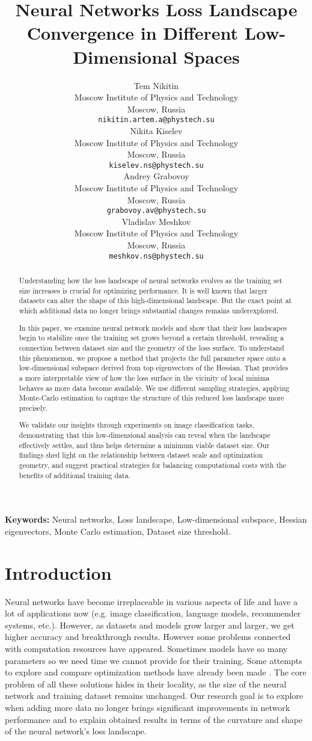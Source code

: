 \documentclass{article}
\title{Neural Networks Loss Landscape Convergence in Different Low-Dimensional Spaces}
\author{
  Tem Nikitin\\
  Moscow Institute of Physics and Technology\\
  Moscow, Russia\\
  \texttt{nikitin.artem.a@phystech.su}\\
  \And
  Nikita Kiselev\\
  Moscow Institute of Physics and Technology\\
  Moscow, Russia\\
  \texttt{kiselev.ns@phystech.su}\\
  \And
  Andrey Grabovoy\\
  Moscow Institute of Physics and Technology\\
  Moscow, Russia\\
  \texttt{grabovoy.av@phystech.su}\\
  \And
  Vladislav Meshkov\\
  Moscow Institute of Physics and Technology\\
  Moscow, Russia\\
  \texttt{meshkov.ns@phystech.su}\\
}
\begin{document}
\maketitle

\begin{abstract}
  Understanding how the loss landscape of neural networks evolves as the training set size increases is crucial for
  optimizing performance. It is well known that larger datasets can alter the shape of this high-dimensional landscape.
  But the exact point at which additional data no longer brings substantial changes remains underexplored.

  In this paper, we examine neural network models and show that their loss landscapes begin to stabilize once the
  training set grows beyond a certain threshold, revealing a connection between dataset size and the geometry of the
  loss surface. To understand this phenomenon, we propose a method that projects the full parameter space onto a
  low-dimensional subspace derived from top eigenvectors of the Hessian. That provides a more interpretable view of how
  the loss surface in the vicinity of local minima behaves as more data become available. We use different sampling
  strategies, applying Monte-Carlo estimation to capture the structure of this reduced loss landscape more precisely.

  We validate our insights through experiments on image classification tasks, demonstrating that this low-dimensional
  analysis can reveal when the landscape effectively settles, and thus helps determine a minimum viable dataset size.
  Our findings shed light on the relationship between dataset scale and optimization geometry, and suggest
  practical strategies for balancing computational costs with the benefits of additional training data.
\end{abstract}

\textbf{Keywords:}
Neural networks, Loss landscape, Low-dimensional subspace, Hessian eigenvectors, Monte Carlo estimation, Dataset size threshold.

\section{Introduction}\label{sec:intro}

Neural networks have become irreplaceable in various aspects of life and have a lot of applications now
(e.g. image classification, language models, recommender systems, etc.). However, as datasets and models grow larger and
larger, we get higher accuracy and breakthrough results. However some problems connected with computation resources have
appeared. Sometimes models have so many parameters so we need time we cannot provide for their training. Some attempts to
explore and compare optimization methods have already been made \cite{soydaner2020comparison}. The core problem of all these
solutions hides in their locality, as the size of the neural network and training dataset remains unchanged. Our research goal
is to explore when adding more data no longer brings significant improvements in network performance and to explain
obtained results in terms of the curvature and shape of the neural network’s loss landscape.
\end{document}
